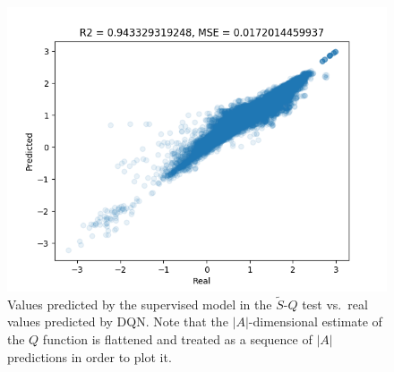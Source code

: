 \begin{figure}
    \includegraphics[width=\textwidth]{pictures/experiments/FQ_test_pong}
    \centering
    \caption[Predictions of $\tilde{S}$-$Q$ mapping experiment]{Values predicted 
	     by the supervised model in the $\tilde{S}$-$Q$ test vs.\ real 
	     values predicted by DQN. Note that the $|A|$-dimensional estimate 
	     of the $Q$ function is flattened and treated as a sequence of 
	     $|A|$ predictions in order to plot it.}
    \label{f:FQ_test_all_three}
\end{figure}
%

